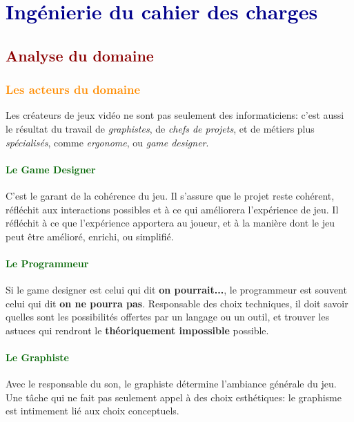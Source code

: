 \documentclass[ebook, 8pt, oneside, openany]{memoir}
\begin{document}
	\tableofcontents \pagebreak \listoffigures
	
	\chapter{\textcolor{darkblue}{Ingénierie du cahier des charges}}
	\section{\textcolor{darkred}{Analyse du domaine}}
	\subsection{\textcolor{darkorange}{Les acteurs du domaine}}
	Les créateurs de jeux vidéo ne sont pas seulement des informaticiens: c'est aussi le résultat du travail
	de \textit{graphistes}, de \textit{chefs de projets}, et de métiers plus \textit{spécialisés}, comme
	\textit{ergonome}, ou \textit{game designer}.
	\subsubsection{\textcolor{darkgreen}{Le Game Designer}}
	C'est le garant de la cohérence du jeu. Il s'assure que le projet reste cohérent, réfléchit aux
	interactions possibles et à ce qui améliorera l'expérience de jeu. Il réfléchit à ce que l'expérience
	apportera au joueur, et à la manière dont le jeu peut être amélioré, enrichi, ou simplifié.
	\subsubsection{\textcolor{darkgreen}{Le Programmeur}}
	Si le game designer est celui qui dit \textbf{on pourrait...}, le programmeur est souvent celui qui dit 
	\textbf{on ne pourra pas}. Responsable des choix techniques, il doit savoir quelles sont les
	possibilités offertes par un langage ou un outil, et trouver les astuces qui rendront le
	\textbf{théoriquement impossible} possible.
	\subsubsection{\textcolor{darkgreen}{Le Graphiste}}
	Avec le responsable du son, le graphiste détermine l'ambiance générale du jeu. Une tâche qui ne fait pas 
	seulement appel à des choix esthétiques: le graphisme est intimement lié aux choix conceptuels.
\end{document}
